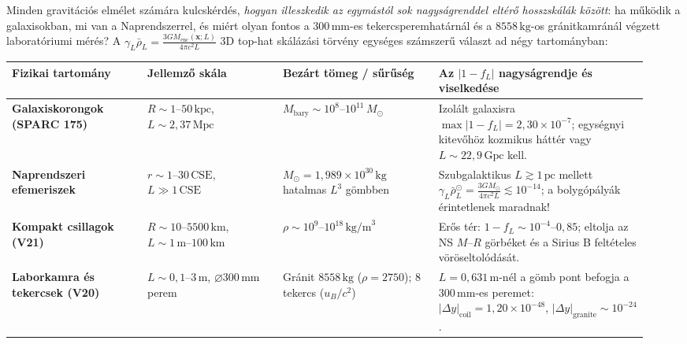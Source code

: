 \par
Minden gravit\'aci\'os elmélet sz\'am\'ara kulcsk\'erd\'es, \emph{hogyan illeszkedik az egym\'ast\'ol sok nagys\'agrenddel elt\'er\H{o} hosszsk\'al\'ak k\"oz\"ott}: ha m\H{u}k\"odik a galaxisokban, mi van a Naprendszerrel, \'es mi\'ert olyan fontos a $300\,\text{mm}$-es tekercsperemhat\'arn\'al \'es a $8558\,\text{kg}$-os gr\'anitkamr\'an\'al v\'egzett laborat\'oriumi m\'er\'es? A $\gamma_L \bar{\rho}_L = \frac{3 G M_{\text{enc}}(\mathbf{x};L)}{4\pi c^2 L}$ 3D top-hat sk\'al\'az\'asi t\"orv\'eny egys\'eges sz\'amszer\H{u} v\'alaszt ad n\'egy tartom\'anyban:
\begin{center}\vspace{-2pt}
{\footnotesize
\begin{tabular}{@{}>{\bfseries}p{0.20\linewidth}p{0.20\linewidth}p{0.23\linewidth}p{0.31\linewidth}@{}}
\toprule
Fizikai tartom\'any & Jellemz\H{o} sk\'ala & Bez\'art t\"omeg / s\H{u}r\H{u}s\'eg & Az $|1 - f_L|$ nagys\'agrendje \'es viselked\'ese \\
\midrule
Galaxiskorongok (SPARC 175) & $R \sim 1\text{--}50\,\text{kpc}$, $L \sim 2{,}37\,\text{Mpc}$ & $M_{\text{bary}} \sim 10^8\text{--}10^{11}\,M_\odot$ & Izol\'alt galaxisra $\max|1-f_L| = 2{,}30\times 10^{-7}$; egys\'egnyi kitev\H{o}h\"oz kozmikus h\'att\'er vagy $L\sim 22{,}9\,\text{Gpc}$ kell. \\
Naprendszeri efemeriszek & $r \sim 1\text{--}30\,\text{CSE}$, $L \gg 1\,\text{CSE}$ & $M_\odot = 1{,}989\times 10^{30}\,\text{kg}$ hatalmas $L^3$ g\"ombben & Szubgalaktikus $L \gtrsim 1\,\text{pc}$ mellett $\gamma_L\bar{\rho}_L^\odot = \frac{3GM_\odot}{4\pi c^2 L} \lesssim 10^{-14}$; a bolyg\'op\'aly\'ak \'erintetlenek maradnak! \\
Kompakt csillagok (V21) & $R \sim 10\text{--}5500\,\text{km}$, $L \sim 1\,\text{m}\text{--}100\,\text{km}$ & $\rho \sim 10^9\text{--}10^{18}\,\text{kg/m}^3$ & Er\H{o}s t\'er: $1-f_L \sim 10^{-4}\text{--}0{,}85$; eltolja az NS $M$--$R$ g\"orb\'eket \'es a Sirius B felt\'eteles v\"or\"oseltol\'od\'as\'at. \\
Laborkamra \'es tekercsek (V20) & $L \sim 0{,}1\text{--}3\,\text{m}$, $\varnothing 300\,\text{mm}$ perem & Gr\'anit $8558\,\text{kg}$ ($\rho=2750$); 8 tekercs ($u_B/c^2$) & $L=0{,}631\,\text{m}$-n\'el a g\"omb pont befogja a $300\,\text{mm}$-es peremet: $|\Delta y|_{\text{coil}}=1{,}20\times 10^{-48}$, $|\Delta y|_{\text{granite}}\sim 10^{-24}$. \\
\bottomrule
\end{tabular}}
\end{center}
